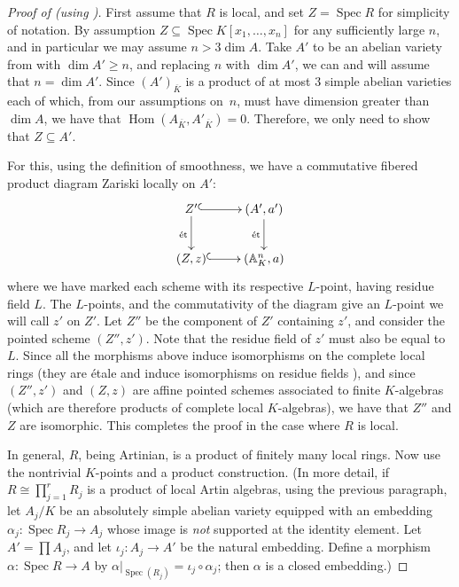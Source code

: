 \documentclass[11pt, reqno]{amsart}
\numberwithin{equation}{section}
\theoremstyle{definition}
\theoremstyle{remark}
\def\iso{\cong}
\renewcommand{\bar}[1]{{\overline{#1}}}
\DeclareMathOperator{\spec}{Spec}
\begin{document}
\begin{proof}[Proof of  (using )]
 First assume that $R$ is local, and set $Z=\operatorname{Spec}R$ for simplicity of notation.  
 By assumption $Z\subseteq \operatorname{Spec}K[x_1,\dots,x_n]$ for any sufficiently large $n$, and in particular we may assume  $n>3\dim A$.  Take $A'$ to be an abelian variety from  with $\dim A'\ge n$, and replacing $n$ with $\dim A'$, we can and will assume that $n=\dim A'$.
  Since $(A')_{\bar K}$ is a product of at most $3$ simple abelian varieties each of which, from our assumptions on~$n$, must  have dimension greater than $\dim A$, we have that $\operatorname{Hom}(A_{\bar K},A'_{\bar K})=0$.  Therefore, we only need to show that $Z\subseteq A'$.  
 
  For this,  using the definition of smoothness, we have a commutative fibered product diagram Zariski locally on $A'$:
 $$
 \xymatrix{
 Z' \ar@{^(->}[r] \ar[d]_{\text{\'et}}& (A',a') \ar[d]_{\text{\'et}}\\
 (Z,z) \ar@{^(->}[r]& (\mathbb A^n_K,a)
 }
 $$
 where we have marked each scheme with its respective $L$-point, having residue field $L$.  
 The $L$-points, and the commutativity of the diagram give an $L$-point we will call $z'$ on $Z'$.  Let $Z''$ be the component of $Z'$ containing $z'$, and consider the pointed scheme $(Z'',z')$.  Note that the residue field of $z'$ must also be equal to $L$.    
Since all the morphisms above induce isomorphisms on the complete local rings (they are \'etale and induce isomorphisms on residue fields \cite[Prop.~17.6.3]{EGAIV4}), and since  $(Z'',z')$ and $(Z,z)$ are affine pointed schemes associated to finite $K$-algebras (which are therefore products of complete local $K$-algebras),  we have that $Z''$ and $Z$  are isomorphic.  This completes the proof in the case where $R$ is local.  


In general, $R$, being Artinian, is a product of finitely many local
rings.  Now use the nontrivial $K$-points and a product construction.
(In more detail, if $R \iso \prod_{j=1}^r R_j$ is a product of local
Artin algebras, using the previous paragraph, let $A_j/K$ be an absolutely simple abelian variety
equipped with an embedding $\alpha_j: \spec R_j \to A_j$ whose image
is \emph{not} supported at the identity element.  Let $A' =
\prod A_j$, and let $\iota_j: A_j \to A'$ be the natural embedding.
Define a morphism $\alpha: \spec R \to A$ by $\alpha|_{\spec(R_j)} =
\iota_j \circ \alpha_j$; then $\alpha$ is a closed embedding.)
\end{proof}   
\end{document}
